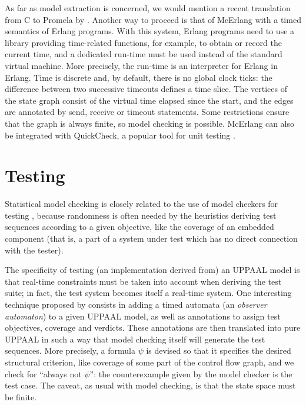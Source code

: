 \documentclass[a4paper,11pt,twoside]{article}
\newcommand\Promela{\textsf{Promela}\xspace}
\newcommand\UPPAAL{\textsf{UPPAAL}\xspace}
\newcommand\McErlang{\textsf{McErlang}\xspace}
\newcommand\QuickCheck{\textsf{QuickCheck}\xspace}
\newcommand\Erlang{\textsf{Erlang}\xspace}
\newcommand\Clang{\textsf{C}\xspace}
\begin{document}
As far as model extraction is concerned, we would mention a recent
translation from \Clang to \Promela by \citet{Jiang:2009}. Another way
to proceed is that of \McErlang
\citep{Benac_EarleFredlund:2010,Benac_EarleFredlund:2012} with a timed
semantics of \Erlang programs. With this system, \Erlang programs need
to use a library providing time\hyp{}related functions, for example,
to obtain or record the current time, and a dedicated run\hyp{}time
must be used instead of the standard virtual machine. More precisely,
the run\hyp{}time is an interpreter for \Erlang in \Erlang. Time is
discrete and, by default, there is no global clock ticks: the
difference between two successive timeouts defines a time slice. The
vertices of the state graph consist of the virtual time elapsed since
the start, and the edges are annotated by send, receive or timeout
statements. Some restrictions ensure that the graph is always finite,
so model checking is possible. \McErlang can also be integrated with
\QuickCheck, a popular tool for unit testing
\citep{Anonymous:XXXX,Svensson:XXX}.

\section{Testing}

Statistical model checking is closely related to the use of model
checkers for testing \citep{LarsenMikucionisNielsen:2004}, because
randomness is often needed by the heuristics deriving test sequences
according to a given objective, like the coverage of an embedded
component (that is, a part of a system under test which has no direct
connection with the tester).

The specificity of testing (an implementation derived from) an \UPPAAL
model is that real\hyp{}time constraints must be taken into account
when deriving the test suite; in fact, the test system becomes itself
a real\hyp{}time system. One interesting technique proposed by
\citet{Hessel_et_al:2008} consists in adding a timed automata (an
\emph{observer automaton}) to a given \UPPAAL model, as well as
annotations to assign test objectives, coverage and verdicts. These
annotations are then translated into pure \UPPAAL in such a way that
model checking itself will generate the test sequences. More
precisely, a formula $\psi$ is devised so that it specifies the
desired structural criterion, like coverage of some part of the
control flow graph, and we check for ``always not $\psi$'': the
counterexample given by the model checker is the test case. The
caveat, as usual with model checking, is that the state space must be
finite.
\end{document}
